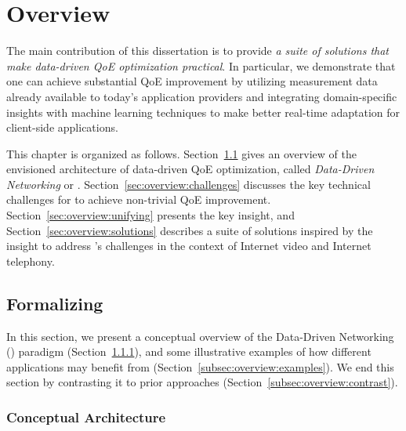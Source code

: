 \chapter{Overview}
\label{ch:overview}

The main contribution of this dissertation is to provide {\em a suite of solutions
that make data-driven QoE optimization practical}.
In particular, we  demonstrate that one can achieve substantial QoE improvement
by utilizing measurement data already available to today's application 
providers and integrating domain-specific insights with machine learning 
techniques to make better real-time adaptation for client-side applications.

This chapter is organized as follows.
Section~\ref{sec:overview:arch} gives an overview of the envisioned 
architecture of data-driven QoE optimization, 
called {\em Data-Driven Networking} or {\em \ddn}.
Section~\ref{sec:overview:challenges} discusses the key technical 
challenges for \ddn to achieve non-trivial QoE improvement.
Section~\ref{sec:overview:unifying} presents the key insight,
and Section~\ref{sec:overview:solutions} 
describes a suite of solutions inspired by the insight to address \ddn's
challenges in the context of Internet video and Internet telephony.


\section{Formalizing \ddn}
\label{sec:overview:arch}

In this section, we present a conceptual overview of the Data-Driven 
Networking (\ddn) paradigm (Section~\ref{subsec:overview:concept}),
and some illustrative examples of how different applications   
may benefit from \ddn (Section~\ref{subsec:overview:examples}).
We end this section by contrasting it to prior
approaches (Section~\ref{subsec:overview:contrast}).

\subsection{Conceptual Architecture}
\label{subsec:overview:concept}

